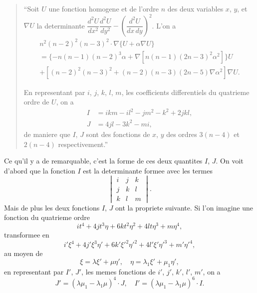 \documentclass[11pt,a4paper]{book}
\begin{document}
\begin{quote}
``Soit $U$ une fonction homogene et de l'ordre $n$ des deux variables $x$, $y$, et $\nabla U$
la determinante $\dfrac{d^2U}{dx^2} \dfrac{d^2U}{dy^2} - \left(\dfrac{d^2U}{dx\,dy}\right)^2$. L'on a
\begin{multline*}
n^2(n-2)^2(n-3)^2 \cdot \nabla\{U + \alpha \nabla U\} \\
= \{-n(n-1)(n-2)^3 \alpha + \nabla [n(n-1)(2n-3)^2 \alpha^2]\} U \\
+ [(n-2)^2(n-3)^2 + (n-2)(n-3)(2n-5)\nabla \alpha^2] \nabla U.
\end{multline*}

En representant par $i$, $j$, $k$, $l$, $m$, les coefficients differentiels du quatrieme ordre
de $U$, on a
\begin{align*}
I &= ikm - il^2 - jm^2 - k^2 + 2jkl,\\
J &= 4jl - 3k^2 - mi,
\end{align*}
de maniere que $I$, $J$ sont des fonctions de $x$, $y$ des ordres $3(n-4)$ et $2(n-4)$
respectivement.''
\end{quote}

Ce qu'il y a de remarquable, c'est la forme de ces deux quantites $I$, $J$. On voit
d'abord que la fonction $I$ est la determinante formee avec les termes
\[
\begin{vmatrix}
i & j & k\\
j & k & l\\
k & l & m
\end{vmatrix}.
\]
Mais de plus les deux fonctions $I$, $J$ ont la propriete suivante. Si l'on imagine une
fonction du quatrieme ordre
\[
it^4 + 4jt^3\eta + 6kt^2\eta^2 + 4lt\eta^3 + m\eta^4,
\]
transformee en
\[
i'\xi^4 + 4j'\xi^3\eta' + 6k'\xi'^2\eta'^2 + 4l'\xi'\eta'^3 + m'\eta'^4,
\]
au moyen de
\[
\xi = \lambda \xi' + \mu \eta',\quad \eta = \lambda_1 \xi' + \mu_1 \eta',
\]
en representant par $I'$, $J'$, les memes fonctions de $i'$, $j'$, $k'$, $l'$, $m'$, on a
\[
J' = (\lambda\mu_1 - \lambda_1\mu)^4 \cdot J,\quad I' = (\lambda\mu_1 - \lambda_1\mu)^6 \cdot I.
\]

\newpage
\setcounter{page}{116}
\end{document}

